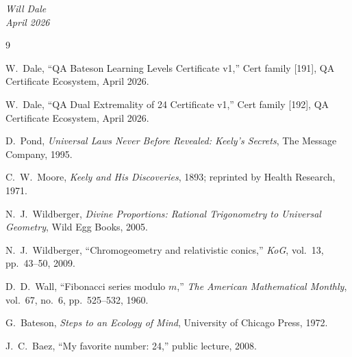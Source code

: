 \documentclass[11pt,a4paper]{article}
\begin{document}
\bigskip
\begin{flushright}
\emph{Will Dale}\\
\emph{April 2026}
\end{flushright}

\begin{thebibliography}{9}

W.~Dale, ``QA Bateson Learning Levels Certificate v1,'' Cert family
[191], QA Certificate Ecosystem, April 2026.

W.~Dale, ``QA Dual Extremality of 24 Certificate v1,'' Cert family
[192], QA Certificate Ecosystem, April 2026.

D.~Pond, \emph{Universal Laws Never Before Revealed: Keely's Secrets},
The Message Company, 1995.

C.~W.~Moore, \emph{Keely and His Discoveries}, 1893; reprinted by
Health Research, 1971.

N.~J.~Wildberger, \emph{Divine Proportions: Rational Trigonometry to
Universal Geometry}, Wild Egg Books, 2005.

N.~J.~Wildberger, ``Chromogeometry and relativistic conics,''
\emph{KoG}, vol.~13, pp.~43--50, 2009.

D.~D.~Wall, ``Fibonacci series modulo $m$,'' \emph{The American
Mathematical Monthly}, vol.~67, no.~6, pp.~525--532, 1960.

G.~Bateson, \emph{Steps to an Ecology of Mind}, University of Chicago
Press, 1972.

J.~C.~Baez, ``My favorite number: 24,'' public lecture, 2008.

\end{thebibliography}
\end{document}
